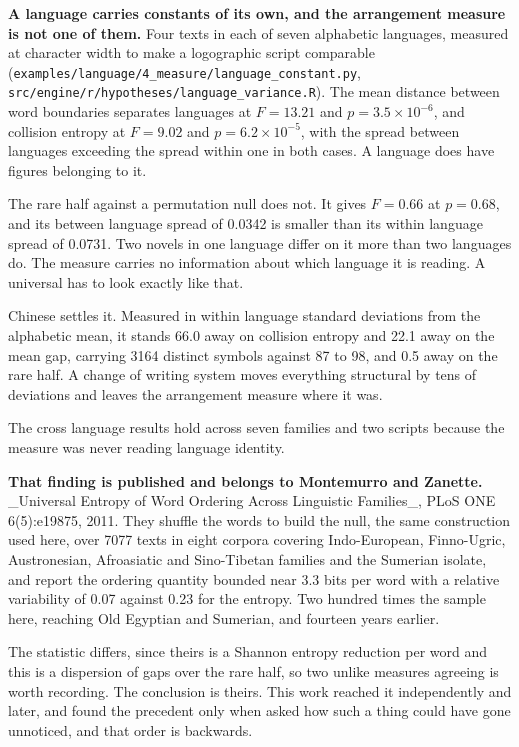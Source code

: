 \textbf{A language carries constants of its own, and the arrangement measure is not one of them.} Four texts in each of seven alphabetic languages, measured at character width to make a logographic script comparable (\texttt{examples/\allowbreak{}language/\allowbreak{}4\_\allowbreak{}measure/\allowbreak{}language\_\allowbreak{}constant.\allowbreak{}py}, \texttt{src/\allowbreak{}engine/\allowbreak{}r/\allowbreak{}hypotheses/\allowbreak{}language\_\allowbreak{}variance.\allowbreak{}R}). The mean distance between word boundaries separates languages at \(F = 13.21\) and \(p = 3.5 \times 10^{-6}\), and collision entropy at \(F = 9.02\) and \(p = 6.2 \times 10^{-5}\), with the spread between languages exceeding the spread within one in both cases. A language does have figures belonging to it.

The rare half against a permutation null does not. It gives \(F = 0.66\) at \(p = 0.68\), and its between language spread of 0.0342 is smaller than its within language spread of 0.0731. Two novels in one language differ on it more than two languages do. The measure carries no information about which language it is reading. A universal has to look exactly like that.

Chinese settles it. Measured in within language standard deviations from the alphabetic mean, it stands 66.0 away on collision entropy and 22.1 away on the mean gap, carrying 3164 distinct symbols against 87 to 98, and 0.5 away on the rare half. A change of writing system moves everything structural by tens of deviations and leaves the arrangement measure where it was.

The cross language results hold across seven families and two scripts because the measure was never reading language identity.

\textbf{That finding is published and belongs to Montemurro and Zanette.} \_Universal Entropy of Word Ordering Across Linguistic Families\_, PLoS ONE 6(5):e19875, 2011. They shuffle the words to build the null, the same construction used here, over 7077 texts in eight corpora covering Indo-European, Finno-Ugric, Austronesian, Afroasiatic and Sino-Tibetan families and the Sumerian isolate, and report the ordering quantity bounded near 3.3 bits per word with a relative variability of 0.07 against 0.23 for the entropy. Two hundred times the sample here, reaching Old Egyptian and Sumerian, and fourteen years earlier.

The statistic differs, since theirs is a Shannon entropy reduction per word and this is a dispersion of gaps over the rare half, so two unlike measures agreeing is worth recording. The conclusion is theirs. This work reached it independently and later, and found the precedent only when asked how such a thing could have gone unnoticed, and that order is backwards.

